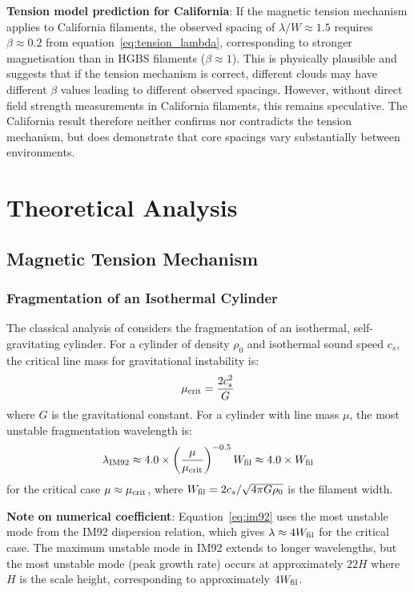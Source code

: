\documentclass[11pt,a4paper]{article}
\begin{document}
\textbf{Tension model prediction for California}: If the magnetic tension mechanism applies to California filaments, the observed spacing of $\lambda/W \approx 1.5$ requires $\beta \approx 0.2$ from equation~\ref{eq:tension_lambda}, corresponding to stronger magnetisation than in HGBS filaments ($\beta \approx 1$). This is physically plausible and suggests that if the tension mechanism is correct, different clouds may have different $\beta$ values leading to different observed spacings. However, without direct field strength measurements in California filaments, this remains speculative. The California result therefore neither confirms nor contradicts the tension mechanism, but does demonstrate that core spacings vary substantially between environments.

\section{Theoretical Analysis}
\label{sec:theory}

\subsection{Magnetic Tension Mechanism}

\subsubsection{Fragmentation of an Isothermal Cylinder}

The classical analysis of \citet{Inutsuka1992} considers the fragmentation of an isothermal, self-gravitating cylinder. For a cylinder of density $\rho_0$ and isothermal sound speed $c_s$, the critical line mass for gravitational instability is:
\begin{equation}
\mu_{\rm crit} = \frac{2c_s^2}{G}
\end{equation}
where $G$ is the gravitational constant. For a cylinder with line mass $\mu$, the most unstable fragmentation wavelength is:
\begin{equation}
\lambda_{\rm IM92} \approx 4.0 \times \left(\frac{\mu}{\mu_{\rm crit}}\right)^{-0.5} W_{\rm fil} \approx 4.0 \times W_{\rm fil}
\label{eq:im92}
\end{equation}
for the critical case $\mu \approx \mu_{\rm crit}$, where $W_{\rm fil} = 2c_s/\sqrt{4\pi G\rho_0}$ is the filament width.

\textbf{Note on numerical coefficient}: Equation~\ref{eq:im92} uses the most unstable mode from the IM92 dispersion relation, which gives $\lambda \approx 4W_{\rm fil}$ for the critical case. The maximum unstable mode in IM92 extends to longer wavelengths, but the most unstable mode (peak growth rate) occurs at approximately $22H$ where $H$ is the scale height, corresponding to approximately $4W_{\rm fil}$.
\end{document}
